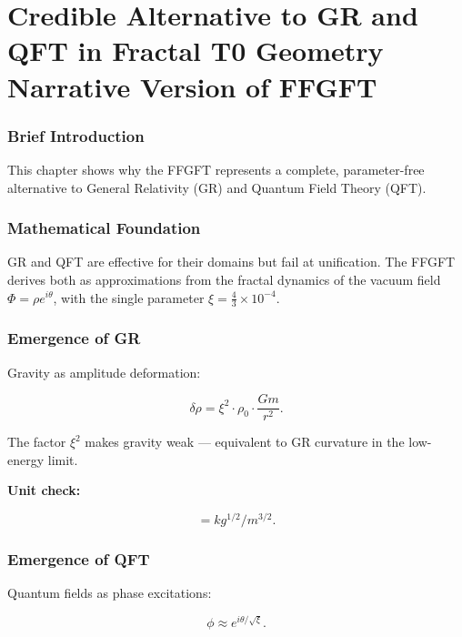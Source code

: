 \chapter{Credible Alternative to GR and QFT in Fractal T0 Geometry  Narrative Version of FFGFT}


	
	\subsection*{Brief Introduction}
	
	This chapter shows why the FFGFT represents a complete, parameter-free alternative to General Relativity (GR) and Quantum Field Theory (QFT).
	
	\subsection*{Mathematical Foundation}
	
	GR and QFT are effective for their domains but fail at unification. The FFGFT derives both as approximations from the fractal dynamics of the vacuum field \(\Phi = \rho e^{i\theta}\), with the single parameter \(\xi = \frac{4}{3} \times 10^{-4}\).
	
	\subsection*{Emergence of GR}
	
	Gravity as amplitude deformation:
	
	\begin{equation}
		\delta \rho = \xi^2 \cdot \rho_0 \cdot \frac{G m}{r^2}.
	\end{equation}
	
	The factor \(\xi^2\) makes gravity weak — equivalent to GR curvature in the low-energy limit.
	
	\textbf{Unit check:}
	
	\begin{equation}
		[\delta \rho] = \si{kg^{1/2}/m^{3/2}}.
	\end{equation}
	
	\subsection*{Emergence of QFT}
	
	Quantum fields as phase excitations:
	
	\begin{equation}
		\phi \approx e^{i \theta / \sqrt{\xi}}.
	\end{equation}
	
